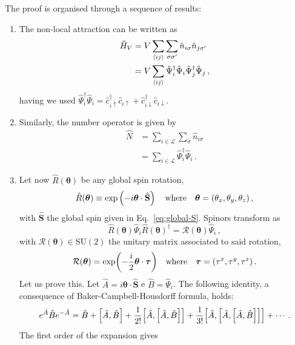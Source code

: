 \begin{tabproof}[Proof of Eq.~\eqref{eq:[HV,S]=0-[N,S]=0}: $\hat H_V$ and $\hat N$ are $\mathrm{SU}(2)$ symmetric]
	
	The proof is organised through a sequence of results:	
	\begin{enumerate}
		\item The non-local attraction can be written as
		\begin{align}
			\hat H_V &= V\sum_{\ev{ij}} \sum_{\sigma\sigma'} \hat n_{i\sigma} \hat n_{j\sigma'} \nonumber \\
			&= V\sum_{\ev{ij}} \hat \Psi_i^\dagger \hat \Psi_i \hat \Psi_j^\dagger \hat \Psi_j \, , \label{eq:ehm-HV-4xPsi}
		\end{align}
		having we used $\hat \Psi_i^\dagger \hat \Psi_i = \hat c_{i\uparrow}^\dagger \hat c_{i\uparrow} + \hat c_{i\downarrow}^\dagger \hat c_{i\downarrow}$.
		\item Similarly, the number operator is given by
		\begin{align}
			\hat N &= \sum_{i \in \mathcal{L}} \sum_{\sigma} \hat n_{i\sigma} \nonumber \\
			&= \sum_{i \in \mathcal{L}} \hat \Psi_i^\dagger \hat \Psi_i \label{eq:ehm-N-2xPsi} \, .
		\end{align}
		\item Let now $\hat R(\bm{\theta})$ be any global spin rotation,
		\[
			\hat R (\bm{\theta}) \equiv \exp \left(-i \bm{\theta} \cdot \hat{\mathbf{S}}\right)
			\qq{where}
			\bm{\theta} = (\theta_x,\theta_y,\theta_z) \, ,
		\]
		with $\hat {\mathbf{S}}$ the global spin given in Eq.~\eqref{eq:global-S}. Spinors transform as
		\[
			\hat R (\bm{\theta}) \hat \Psi_i \hat R (\bm{\theta})^\dagger = \mathcal{R}(\bm{\theta}) \hat \Psi_i \, ,
		\]
		with $\mathcal{R}(\bm{\theta}) \in \mathrm{SU}(2)$ the unitary matrix associated to said rotation,
		\begin{equation}\label{eq:ehm-R-exp}
			\mathcal{R}(\bm{\theta}) = \exp(- \frac{i}{2} \bm{\theta} \cdot \bm{\tau})
			\qq{where}
			\bm{\tau} = (\tau^x,\tau^y,\tau^z) \, .
		\end{equation}
		Let us prove this. Let $\hat A = i \bm{\theta} \cdot \hat{\mathbf{S}}$ e $\hat B = \hat \Psi_i$. The following identity, a consequence of Baker-Campbell-Housdorff formula, holds:
		\[
			e^{\hat A} \hat B e^{-\hat A} = \hat B + \comm{\hat A}{\hat B} + \frac{1}{2!} \comm{\hat A}{ \comm{\hat A}{\hat B}} + \frac{1}{3!} \comm{\hat A}{\comm{\hat A}{\comm{\hat A}{\hat B}}} + \cdots \, .
		\]
		The first order of the expansion gives

\end{enumerate}
\end{tabproof}
